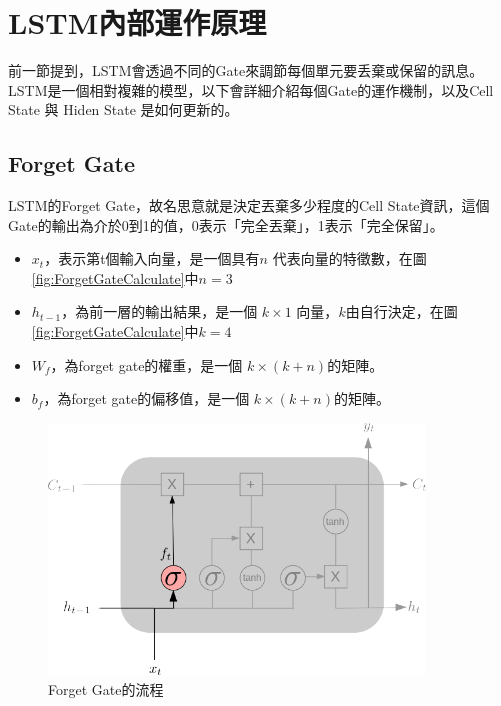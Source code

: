 \newpage

\section{LSTM內部運作原理}

前一節提到，LSTM會透過不同的Gate來調節每個單元要丢棄或保留的訊息。LSTM是一個相對複雜的模型，以下會詳細介紹每個Gate的運作機制，以及Cell State 與 Hiden State 是如何更新的。



\subsection{Forget Gate}

LSTM的Forget Gate，故名思意就是決定丟棄多少程度的Cell State資訊，這個Gate的輸出為介於0到1的值，0表示「完全丟棄」，1表示「完全保留」。

\begin{itemize}
	\item 
		\(x_t\)，表示第t個輸入向量，是一個具有\(n\) 代表向量的特徵數，在圖 \ref{fig:ForgetGateCalculate}中\(n = 3\) 

	\item 
		\(h_{t-1}\)，為前一層的輸出結果，是一個 \(k \times 1\) 向量，\(k\)由自行決定，在圖 \ref{fig:ForgetGateCalculate}中\(k = 4\) 

	\item 
		\(W_f\)，為forget gate的權重，是一個 \(k \times (k+n)\)的矩陣。

	\item 
		\(b_f\)，為forget gate的偏移值，是一個 \(k \times (k+n)\)的矩陣。
\end{itemize}



\begin{figure}[H]
	\centering
	\includegraphics[width=10cm]{./pic/DR88VjoI.png}
	\caption{Forget Gate的流程}
	\label{fig:ForgetGate}
\end{figure}


